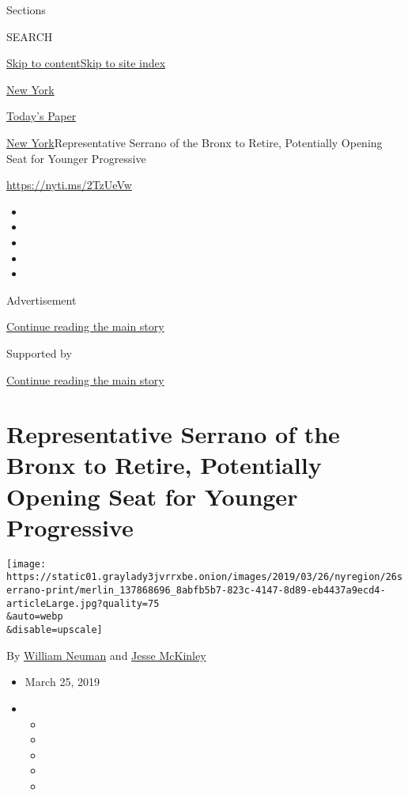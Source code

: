 Sections

SEARCH

\protect\hyperlink{site-content}{Skip to
content}\protect\hyperlink{site-index}{Skip to site index}

\href{https://www.nytimes3xbfgragh.onion/section/nyregion}{New York}

\href{https://myaccount.nytimes3xbfgragh.onion/auth/login?response_type=cookie\&client_id=vi}{}

\href{https://www.nytimes3xbfgragh.onion/section/todayspaper}{Today's
Paper}

\href{/section/nyregion}{New York}\textbar{}Representative Serrano of
the Bronx to Retire, Potentially Opening Seat for Younger Progressive

\url{https://nyti.ms/2TzUeVw}

\begin{itemize}
\item
\item
\item
\item
\item
\end{itemize}

Advertisement

\protect\hyperlink{after-top}{Continue reading the main story}

Supported by

\protect\hyperlink{after-sponsor}{Continue reading the main story}

\hypertarget{representative-serrano-of-the-bronx-to-retire-potentially-opening-seat-for-younger-progressive}{%
\section{Representative Serrano of the Bronx to Retire, Potentially
Opening Seat for Younger
Progressive}\label{representative-serrano-of-the-bronx-to-retire-potentially-opening-seat-for-younger-progressive}}

\texttt{[image: https://static01.graylady3jvrrxbe.onion/images/2019/03/26/nyregion/26serrano-print/merlin\_137868696\_8abfb5b7-823c-4147-8d89-eb4437a9ecd4-articleLarge.jpg?quality=75\\\&auto=webp\\\&disable=upscale]}

By \href{https://www.nytimes3xbfgragh.onion/by/william-neuman}{William
Neuman} and
\href{https://www.nytimes3xbfgragh.onion/by/jesse-mckinley}{Jesse
McKinley}

\begin{itemize}
\item
  March 25, 2019
\item
  \begin{itemize}
  \item
  \item
  \item
  \item
  \item
  \end{itemize}
\end{itemize}

